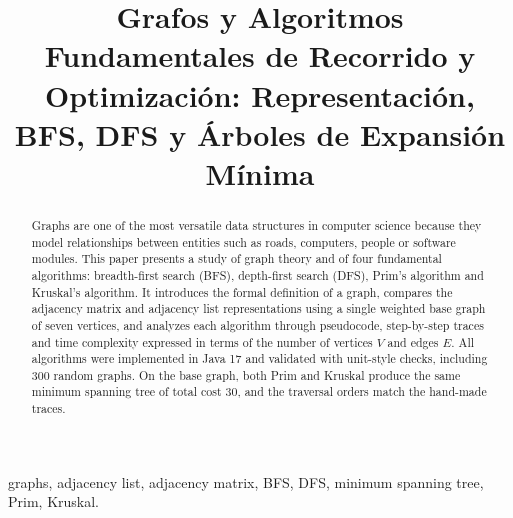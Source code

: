 \documentclass[conference]{IEEEtran}
\begin{document}
\title{Grafos y Algoritmos Fundamentales de Recorrido y Optimización: Representación, BFS, DFS y Árboles de Expansión Mínima}

\author{
}

\maketitle

\def\IEEEkeywordsname{Keywords}
\begin{abstract}
Graphs are one of the most versatile data structures in computer science because they model relationships between entities such as roads, computers, people or software modules. This paper presents a study of graph theory and of four fundamental algorithms: breadth-first search (BFS), depth-first search (DFS), Prim's algorithm and Kruskal's algorithm. It introduces the formal definition of a graph, compares the adjacency matrix and adjacency list representations using a single weighted base graph of seven vertices, and analyzes each algorithm through pseudocode, step-by-step traces and time complexity expressed in terms of the number of vertices $V$ and edges $E$. All algorithms were implemented in Java 17 and validated with unit-style checks, including 300 random graphs. On the base graph, both Prim and Kruskal produce the same minimum spanning tree of total cost 30, and the traversal orders match the hand-made traces.
\end{abstract}

\begin{IEEEkeywords}
graphs, adjacency list, adjacency matrix, BFS, DFS, minimum spanning tree, Prim, Kruskal.
\end{IEEEkeywords}
\end{document}
